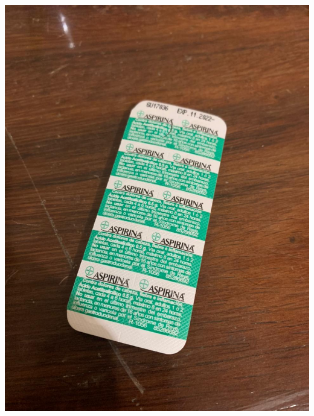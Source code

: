 \documentclass[a4paper,12pt]{article}
\begin{document}
\begin{center}
    \includegraphics[scale=0.2]{Imagenes/3.JPG}
\end{center}
\end{document}
